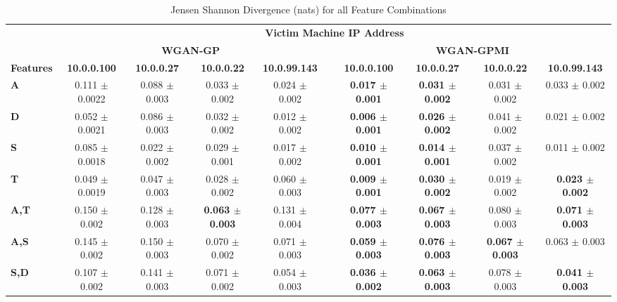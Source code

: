 \begin{table}[!htbp]
	\caption{Jensen Shannon Divergence (nats) for all Feature Combinations}
	\label{tab:jsd}
	\centering
	\small
	\begin{adjustbox}{angle=90}
		\begin{tabular}{l|c|c|c|c|c|c|c|c|c|}
			\multicolumn{1}{c|}{} & \multicolumn{9}{c|}{\textbf{Victim Machine IP Address}} \\
			\multicolumn{1}{c|}{} & \multicolumn{4}{c|}{\textbf{WGAN-GP}} &  & \multicolumn{4}{c|}{\textbf{WGAN-GPMI}} \\
			\multicolumn{1}{c|}{\textbf{Features}} & \textbf{10.0.0.100} & \textbf{10.0.0.27} & \textbf{10.0.0.22} & \textbf{10.0.99.143} & \textbf{} & \textbf{10.0.0.100} & \textbf{10.0.0.27} & \textbf{10.0.0.22} & \textbf{10.0.99.143} \\ \hline
			\textbf{A} & 0.111 $\pm$ 0.0022& 0.088 $\pm$ 0.003 & 0.033 $\pm$ 0.002 & 0.024 $\pm$ 0.002 &  & \textbf{0.017 $\pm$ 0.001} & \textbf{0.031 $\pm$ 0.002} & 0.031  $\pm$ 0.002 & 0.033 $\pm$ 0.002 \\
			\textbf{D} & 0.052 $\pm$ 0.0021& 0.086 $\pm$ 0.003 & 0.032 $\pm$ 0.002 & 0.012 $\pm$ 0.002 &  & \textbf{0.006 $\pm$ 0.001} & \textbf{0.026 $\pm$ 0.002} & 0.041  $\pm$ 0.002 & 0.021 $\pm$ 0.002 \\
			\textbf{S} & 0.085 $\pm$ 0.0018& 0.022 $\pm$ 0.002 & 0.029 $\pm$ 0.001 & 0.017 $\pm$ 0.002 &  & \textbf{0.010 $\pm$ 0.001} & \textbf{0.014 $\pm$ 0.001} & 0.037  $\pm$ 0.002 & 0.011 $\pm$ 0.002 \\
			\textbf{T} & 0.049 $\pm$ 0.0019& 0.047 $\pm$ 0.003 & 0.028 $\pm$ 0.002 & 0.060 $\pm$ 0.003 &  & \textbf{0.009 $\pm$ 0.001} & \textbf{0.030 $\pm$ 0.002} & 0.019  $\pm$ 0.002 & \textbf{0.023 $\pm$ 0.002} \\ \hline
			\textbf{A,T} & 0.150 $\pm$ 0.002 & 0.128 $\pm$ 0.003 & \textbf{0.063 $\pm$ 0.003} & 0.131 $\pm$ 0.004 &  & \textbf{0.077 $\pm$ 0.003} & \textbf{0.067 $\pm$ 0.003} & 0.080 $\pm$ 0.003 & \textbf{0.071 $\pm$ 0.003} \\
			\textbf{A,S} & 0.145 $\pm$ 0.002 & 0.150 $\pm$ 0.003 & 0.070 $\pm$ 0.002 & 0.071 $\pm$ 0.003 &  & \textbf{0.059 $\pm$ 0.003} & \textbf{0.076 $\pm$ 0.003} & \textbf{0.067 $\pm$ 0.003 } & 0.063 $\pm$ 0.003 \\
			\textbf{S,D} & 0.107 $\pm$ 0.002 & 0.141 $\pm$ 0.003 & 0.071 $\pm$ 0.002 & 0.054 $\pm$ 0.003 &  & \textbf{0.036 $\pm$ 0.002} & \textbf{0.063 $\pm$ 0.003} & 0.078  $\pm$ 0.003 & \textbf{0.041 $\pm$ 0.003} \\

\end{tabular}
\end{adjustbox}
\end{table}
